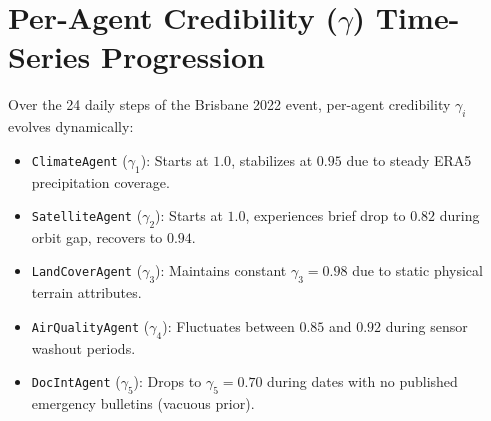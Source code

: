 \section{Per-Agent Credibility ($\gamma$) Time-Series Progression}
\label{app:credibility_progression}
Over the 24 daily steps of the Brisbane 2022 event, per-agent credibility $\gamma_i$ evolves dynamically:
\begin{itemize}
    \item \texttt{ClimateAgent} ($\gamma_1$): Starts at $1.0$, stabilizes at $0.95$ due to steady ERA5 precipitation coverage.
    \item \texttt{SatelliteAgent} ($\gamma_2$): Starts at $1.0$, experiences brief drop to $0.82$ during orbit gap, recovers to $0.94$.
    \item \texttt{LandCoverAgent} ($\gamma_3$): Maintains constant $\gamma_3 = 0.98$ due to static physical terrain attributes.
    \item \texttt{AirQualityAgent} ($\gamma_4$): Fluctuates between $0.85$ and $0.92$ during sensor washout periods.
    \item \texttt{DocIntAgent} ($\gamma_5$): Drops to $\gamma_5 = 0.70$ during dates with no published emergency bulletins (vacuous prior).
\end{itemize}
